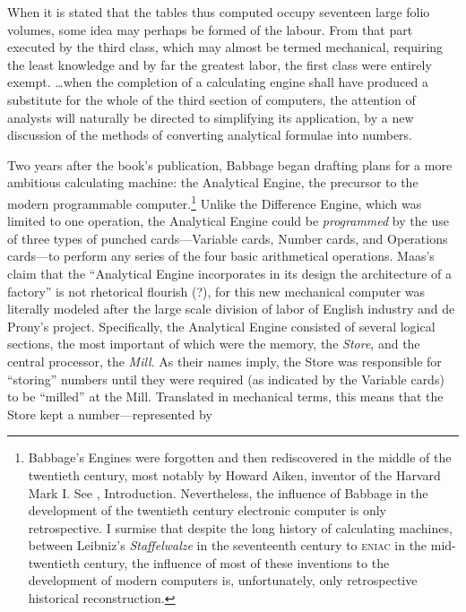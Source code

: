 \documentclass[version=last,draft=false,paper=A4,portrait,twoside=true,twocolumn=false,headinclude=false,footinclude=false,mpinclude=true,fontsize=12,BCOR=20mm,DIV=calc,pagesize=auto,open=right,chapterprefix=true,numbers=autoendperiod,headsepline=false,headings=twolinechapter,parskip=false]{scrbook}
\begin{document}
\begin{displayquote}
When it is stated that the tables thus computed occupy seventeen large
folio volumes, some idea may perhaps be formed of the labour. From that
part executed by the third class, which may almost be termed mechanical,
requiring the least knowledge and by far the greatest labor, the first
class were entirely exempt. \ldots when the completion of a calculating
engine shall have produced a substitute for the whole of the third section
of computers, the attention of analysts will naturally be directed to
simplifying its application, by a new discussion of the methods of
converting analytical formulae into numbers.
\end{displayquote}

Two years after the book's publication, Babbage began drafting plans for a
more ambitious calculating machine: the Analytical Engine, the precursor to
the modern programmable computer.\footnote{Babbage's Engines were forgotten and then rediscovered in the
middle of the twentieth century, most notably by Howard Aiken, inventor of
the Harvard Mark I. See \textcite{aiken1946}, Introduction. Nevertheless, the
influence of Babbage in the development of the twentieth century electronic
computer is only retrospective. I surmise that despite the long history of
calculating machines, between Leibniz's \emph{Staffelwalze} in the seventeenth
century to \textsc{eniac} in the mid-twentieth century, the influence of
most of these inventions to the development of modern computers is,
unfortunately, only retrospective historical reconstruction.} Unlike the Difference Engine,
which was limited to one operation, the Analytical Engine could be
\emph{programmed} by the use of three types of punched cards---Variable cards,
Number cards, and Operations cards---to perform any series of the four
basic arithmetical operations. Maas's claim that the ``Analytical Engine
incorporates in its design the architecture of a factory'' is not
rhetorical flourish (?), for this new mechanical computer was literally
modeled after the large scale division of labor of English industry and de
Prony's project. Specifically, the Analytical Engine consisted of several
logical sections, the most important of which were the memory, the \emph{Store},
and the central processor, the \emph{Mill}. As their names imply, the Store was
responsible for ``storing'' numbers until they were required (as indicated
by the Variable cards) to be ``milled'' at the Mill. Translated in
mechanical terms, this means that the Store kept a number---represented by
\end{document}
